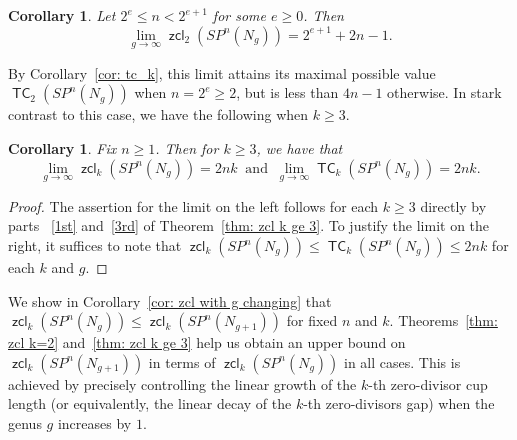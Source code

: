 \documentclass[amscd,amssymb,verbatim,10pt]{amsart}
\numberwithin{equation}{section}
\theoremstyle{plain}
\newtheorem{corollary}[thm]{Corollary}
\theoremstyle{definition}
\DeclareMathOperator{\TC}{{\mathsf{TC}}}
\DeclareMathOperator{\zcl}{{\mathsf{zcl}}}
\begin{document}
\begin{corollary}
    Let $2^e\le n<2^{e+1}$ for some $e\ge 0$. Then
    \[
   \lim_{g\to\infty} \zcl_2(SP^n(N_g))=2^{e+1}+2n-1.
    \]
\end{corollary}

By Corollary~\ref{cor: tc_k}, this limit attains its maximal possible value $\TC_2(SP^n(N_g))$ when $n=2^e\ge 2$, but is less than $4n-1$ otherwise. In stark contrast to this case, we have the following when $k\ge 3$.

\begin{corollary}
    Fix $n\ge 1$. Then for $k\ge 3$, we have that
    \[
    \lim_{g\to \infty}\zcl_k(SP^n(N_g))=2nk \ \text{ and } \ \lim_{g\to \infty}\TC_k(SP^n(N_g))=2nk.
    \]
\end{corollary}

\begin{proof}
    The assertion for the limit on the left follows for each $k\ge 3$ directly by parts ~\eqref{1st} and~\eqref{3rd} of Theorem~\ref{thm: zcl k ge 3}. To justify the limit on the right, it suffices to note that $\zcl_k(SP^n(N_g))\le\TC_k(SP^n(N_g))\le2nk$ for each $k$ and $g$.
\end{proof}

We show in Corollary~\ref{cor: zcl with g changing} that $\zcl_k(SP^n(N_g))\le \zcl_k(SP^n(N_{g+1}))$ for fixed $n$ and $k$. Theorems~\ref{thm: zcl k=2} and~\ref{thm: zcl k ge 3} help us obtain an upper bound on $\zcl_k(SP^n(N_{g+1}))$ in terms of $\zcl_k(SP^n(N_g))$ in all cases. This is achieved by precisely controlling the linear growth of the $k$-th zero-divisor cup length (or equivalently, the linear decay of the $k$-th zero-divisors gap) when the genus $g$ increases by $1$.
\end{document}
